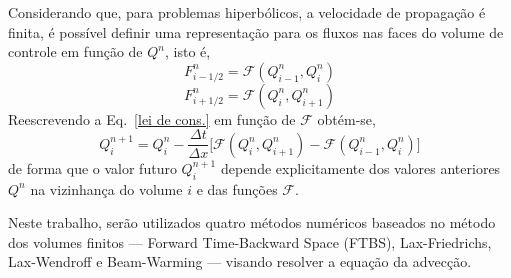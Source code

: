 Considerando que, para problemas hiperbólicos, a velocidade de propagação é
finita, é possível definir uma representação para os fluxos nas faces do volume
de controle em função de $Q^n$, isto é,
\[
    F_{i-1/2}^n = \mathcal{F}(Q_{i-1}^n, Q_i^n)
\]
\[
    F_{i+1/2}^n = \mathcal{F}(Q_i^n, Q_{i+1}^n)
\]
Reescrevendo a Eq.\ \ref{lei de cons.} em função de $\mathcal{F}$ obtém-se,
\begin{equation}
    Q_i^{n+1} = Q_i^n - \frac{\Delta t}{\Delta x}\bigg[
        \mathcal{F}(Q_i^n,Q_{i+1}^n) - \mathcal{F}(Q_{i-1}^n,Q_i^n)
    \bigg]
\end{equation}
de forma que o valor futuro $Q_i^{n+1}$ depende explicitamente dos valores
anteriores $Q^n$ na vizinhança do volume $i$ e das funções $\mathcal{F}$.

Neste trabalho, serão utilizados quatro métodos numéricos baseados no método
dos volumes finitos --- Forward Time-Backward Space (FTBS),\linebreak
Lax-Friedrichs, Lax-Wendroff e Beam-Warming --- visando resolver a equação da
advecção.